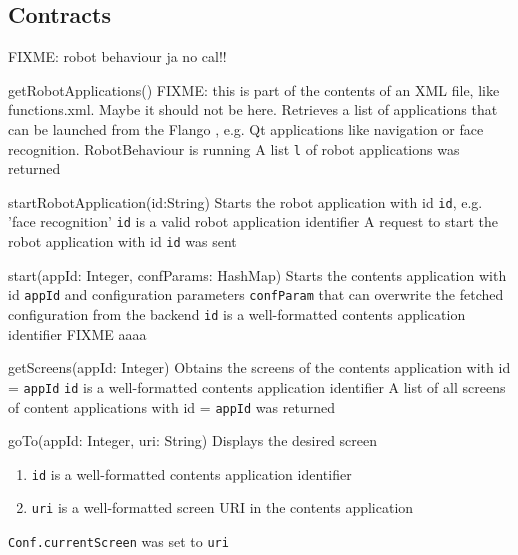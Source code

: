\subsection{Contracts}

FIXME: robot behaviour ja no cal!!

\begin{sopcontract}{getRobotApplications()}
{FIXME: this is part of the contents of an XML file, like functions.xml. Maybe it should not be here. Retrieves a list of applications that can be launched from the Flango \cm , e.g. Qt applications like navigation or face recognition.}
{RobotBehaviour is running}
{A list \texttt{l} of robot applications was returned}
\end{sopcontract}

\begin{sopcontract}{startRobotApplication(id:String)}
{Starts the robot application with id \texttt{id}, e.g. 'face recognition'}
{\texttt{id} is a valid robot application identifier}
{A request to start the robot application with id \texttt{id} was sent}
\end{sopcontract}

\begin{sopcontract}{start(appId: Integer, confParams: HashMap)}
{Starts the contents  application with id \texttt{appId} and configuration parameters \texttt{confParam} that can overwrite the fetched configuration from the backend}
{\texttt{id} is a well-formatted contents application identifier}
{FIXME aaaa}
\end{sopcontract}

\begin{sopcontract}{getScreens(appId: Integer)}
{Obtains the screens of the contents application with id = \texttt{appId}}
{\texttt{id} is a well-formatted contents application identifier}
{A list of all screens of content applications with id = \texttt{appId} was returned}
\end{sopcontract}

\begin{sopcontract}{goTo(appId: Integer, uri: String)}
{Displays the desired screen}
{
\begin{enumerate}
    \item \texttt{id} is a well-formatted contents application identifier 
    \item \texttt{uri} is a well-formatted screen \ac{URI} in the contents application
\end{enumerate}
}
{\texttt{Conf.currentScreen} was set to \texttt{uri}}
\end{sopcontract}

